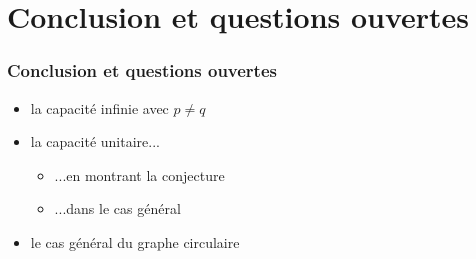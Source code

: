 \section{Conclusion et questions ouvertes}

\begin{frame}[label=Conclusion]
  \frametitle{Conclusion et questions ouvertes}
  {
    \begin{itemize}
    \item la capacité infinie avec $p \ne q$
    \item la capacité unitaire...
      \begin{itemize}
      \item ...en montrant la conjecture
      \item ...dans le cas général
      \end{itemize}
    \item le cas général du graphe circulaire
    \end{itemize}
    \vfill
  }
\end{frame}
